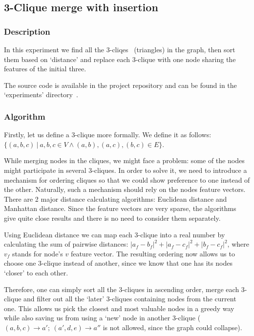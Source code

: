 \newcommand\abs[1]{\ensuremath{\lvert #1 \rvert}}

\subsection{3-Clique merge with insertion}

\subsubsection*{Description}

In this experiment we find all the 3-cliqes~\cite{wiki_clique} (triangles) in the graph, then sort them based on `distance' and replace each 3-clique with one node sharing the features of the initial three.

The source code is available in the project repository and can be found in the `experiments' directory~\cite{3clique_ins_experiment}.

\subsubsection*{Algorithm}

Firstly, let us define a 3-clique more formally.
We define it as follows: $
\{ \left(a, b, c\right)\ 
\lvert\ a, b, c \in V \wedge
\left(a, b\right),
\left(a, c\right),
\left(b, c\right) \in E \} $.

While merging nodes in the cliques, we might face a problem: some of the nodes might participate in several 3-cliques.
In order to solve it, we need to introduce a mechanism for ordering cliques so that we could show preference to one instead of the other.
Naturally, such a mechanism should rely on the nodes feature vectors.
There are 2 major distance calculating algorithms: Euclidean distance and Manhattan distance.
Since the feature vectors are very sparse, the algorithms give quite close results and there is no need to consider them separately.

Using Euclidean distance we can map each 3-clique into a real number by calculating the sum of pairwise distances: $\abs{a_f - b_f}^2 + \abs{a_f - c_f}^2 + \abs{b_f - c_f}^2$, where $v_f$ stands for node's $v$ feature vector.
The resulting ordering now allows us to choose one 3-clique instead of another, since we know that one has its nodes `closer' to each other.

Therefore, one can simply sort all the 3-cliques in ascending order, merge each 3-clique and filter out all the `later' 3-cliques containing nodes from the current one.
This allows us pick the closest and most valuable nodes in a greedy way while also saving us from using a `new' node in another 3-clique ($(a, b, c) \rightarrow a';\ (a', d, e) \rightarrow a''$ is not allowed, since the graph could collapse).

